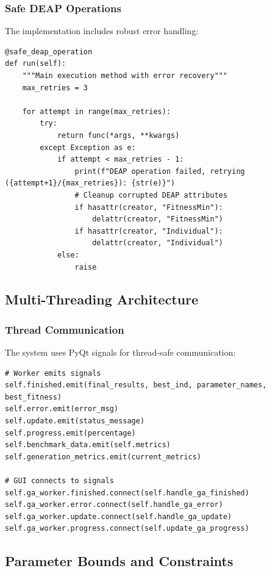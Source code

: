 \documentclass[12pt,a4paper]{article}
\begin{document}
\subsubsection{Safe DEAP Operations}
The implementation includes robust error handling:

\begin{lstlisting}[caption=Safe Operation Decorator]
@safe_deap_operation
def run(self):
    """Main execution method with error recovery"""
    max_retries = 3
    
    for attempt in range(max_retries):
        try:
            return func(*args, **kwargs)
        except Exception as e:
            if attempt < max_retries - 1:
                print(f"DEAP operation failed, retrying ({attempt+1}/{max_retries}): {str(e)}")
                # Cleanup corrupted DEAP attributes
                if hasattr(creator, "FitnessMin"):
                    delattr(creator, "FitnessMin")
                if hasattr(creator, "Individual"):
                    delattr(creator, "Individual")
            else:
                raise
\end{lstlisting}

\subsection{Multi-Threading Architecture}

\subsubsection{Thread Communication}
The system uses PyQt signals for thread-safe communication:

\begin{lstlisting}[caption=Signal Communication]
# Worker emits signals
self.finished.emit(final_results, best_ind, parameter_names, best_fitness)
self.error.emit(error_msg)
self.update.emit(status_message)
self.progress.emit(percentage)
self.benchmark_data.emit(self.metrics)
self.generation_metrics.emit(current_metrics)

# GUI connects to signals
self.ga_worker.finished.connect(self.handle_ga_finished)
self.ga_worker.error.connect(self.handle_ga_error)
self.ga_worker.update.connect(self.handle_ga_update)
self.ga_worker.progress.connect(self.update_ga_progress)
\end{lstlisting}

\subsection{Parameter Bounds and Constraints}
\end{document}
